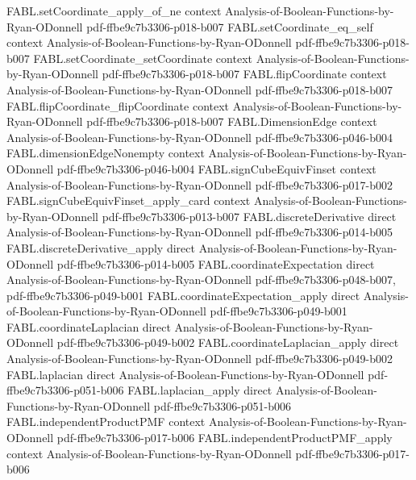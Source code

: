\begin{theorem}
\proofstep
  {FABL.setCoordinate_apply_of_ne}
  {context}
  {Analysis-of-Boolean-Functions-by-Ryan-ODonnell}
  {pdf-ffbe9c7b3306-p018-b007}
\proofstep
  {FABL.setCoordinate_eq_self}
  {context}
  {Analysis-of-Boolean-Functions-by-Ryan-ODonnell}
  {pdf-ffbe9c7b3306-p018-b007}
\proofstep
  {FABL.setCoordinate_setCoordinate}
  {context}
  {Analysis-of-Boolean-Functions-by-Ryan-ODonnell}
  {pdf-ffbe9c7b3306-p018-b007}
\proofstep
  {FABL.flipCoordinate}
  {context}
  {Analysis-of-Boolean-Functions-by-Ryan-ODonnell}
  {pdf-ffbe9c7b3306-p018-b007}
\proofstep
  {FABL.flipCoordinate_flipCoordinate}
  {context}
  {Analysis-of-Boolean-Functions-by-Ryan-ODonnell}
  {pdf-ffbe9c7b3306-p018-b007}
\proofstep
  {FABL.DimensionEdge}
  {context}
  {Analysis-of-Boolean-Functions-by-Ryan-ODonnell}
  {pdf-ffbe9c7b3306-p046-b004}
\proofstep
  {FABL.dimensionEdgeNonempty}
  {context}
  {Analysis-of-Boolean-Functions-by-Ryan-ODonnell}
  {pdf-ffbe9c7b3306-p046-b004}
\proofstep
  {FABL.signCubeEquivFinset}
  {context}
  {Analysis-of-Boolean-Functions-by-Ryan-ODonnell}
  {pdf-ffbe9c7b3306-p017-b002}
\proofstep
  {FABL.signCubeEquivFinset_apply_card}
  {context}
  {Analysis-of-Boolean-Functions-by-Ryan-ODonnell}
  {pdf-ffbe9c7b3306-p013-b007}
\proofstep
  {FABL.discreteDerivative}
  {direct}
  {Analysis-of-Boolean-Functions-by-Ryan-ODonnell}
  {pdf-ffbe9c7b3306-p014-b005}
\proofstep
  {FABL.discreteDerivative_apply}
  {direct}
  {Analysis-of-Boolean-Functions-by-Ryan-ODonnell}
  {pdf-ffbe9c7b3306-p014-b005}
\proofstep
  {FABL.coordinateExpectation}
  {direct}
  {Analysis-of-Boolean-Functions-by-Ryan-ODonnell}
  {pdf-ffbe9c7b3306-p048-b007,
    pdf-ffbe9c7b3306-p049-b001}
\proofstep
  {FABL.coordinateExpectation_apply}
  {direct}
  {Analysis-of-Boolean-Functions-by-Ryan-ODonnell}
  {pdf-ffbe9c7b3306-p049-b001}
\proofstep
  {FABL.coordinateLaplacian}
  {direct}
  {Analysis-of-Boolean-Functions-by-Ryan-ODonnell}
  {pdf-ffbe9c7b3306-p049-b002}
\proofstep
  {FABL.coordinateLaplacian_apply}
  {direct}
  {Analysis-of-Boolean-Functions-by-Ryan-ODonnell}
  {pdf-ffbe9c7b3306-p049-b002}
\proofstep
  {FABL.laplacian}
  {direct}
  {Analysis-of-Boolean-Functions-by-Ryan-ODonnell}
  {pdf-ffbe9c7b3306-p051-b006}
\proofstep
  {FABL.laplacian_apply}
  {direct}
  {Analysis-of-Boolean-Functions-by-Ryan-ODonnell}
  {pdf-ffbe9c7b3306-p051-b006}
\proofstep
  {FABL.independentProductPMF}
  {context}
  {Analysis-of-Boolean-Functions-by-Ryan-ODonnell}
  {pdf-ffbe9c7b3306-p017-b006}
\proofstep
  {FABL.independentProductPMF_apply}
  {context}
  {Analysis-of-Boolean-Functions-by-Ryan-ODonnell}
  {pdf-ffbe9c7b3306-p017-b006}

\end{theorem}

